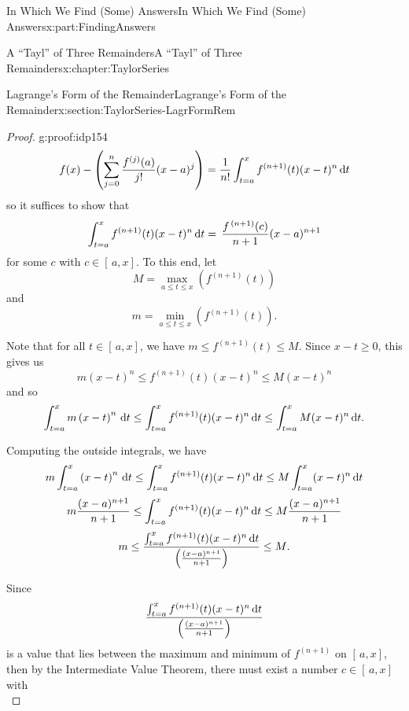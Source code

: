 \documentclass[oneside,10pt,]{book}
\numberwithin{equation}{section}
\newcommand{\dx}[1]{\,{\rm d}#1}
\begin{document}
\begin{partptx}{In Which We Find (Some) Answers}{}{In Which We Find (Some) Answers}{}{}{x:part:FindingAnswers}
\begin{chapterptx}{A ``Tayl'' of Three Remainders}{}{A ``Tayl'' of Three Remainders}{}{}{x:chapter:TaylorSeries}
\begin{sectionptx}{Lagrange's Form of the Remainder}{}{Lagrange's Form of the Remainder}{}{}{x:section:TaylorSeries-LagrFormRem}
\begin{proof}{}{g:proof:idp154}
\begin{equation*}
f(x)-\left(\sum_{j=0}^n\frac{f^{(j)}(a)}{j!}(x-a)^j\right)=\frac{1}{n!} \int_{t=a}^xf^{(n+1)}(t)(x-t)^n\dx{ t}
\end{equation*}
so it suffices to show that%
\begin{equation*}
\int_{t=a}^xf^{(n+1)}(t)(x-t)^n\dx{ t}=\,\frac{f^{\,(n+1)}(c)}{n+1}(x-a)^{n+1}
\end{equation*}
for some \(c\) with \(c\in[\,a,x]\). To this end, let%
\begin{equation*}
M=\max_{a\le t\le x}\left(f^{(n+1)}(t)\right)
\end{equation*}
and%
\begin{equation*}
m=\min_{a\le t\le x}\left(f^{(n+1)}(t)\right)\text{.}
\end{equation*}
%
\par
Note that for all \(t\in[\,a,x]\), we have \(m\leq f^{(n+1)}(t)\leq M\). Since \(x-t\geq 0\), this gives us%
\begin{equation}
m\left(x-t\right)^n\leq f^{(n+1)}(t)(x-t)^n\leq M(x-t)^n\label{x:men:eq_LagRem1}
\end{equation}
and so%
\begin{equation}
\int_{t=a}^xm\left(x-t\right)^n\dx{ t}\leq\int_{t=a}^xf^{(n+1)}(t)(x-t)^n\dx{ t}\leq \int_{t=a}^xM(x-t)^n\dx{ t}\text{.}\label{x:men:eq_LagRem2}
\end{equation}
%
\par
Computing the outside integrals, we have%
\begin{equation*}
m\int_{t=a}^x\left(x-t\right)^n\dx{ t}\leq\int_{t=a}^xf^{(n+1)}(t)(x-t)^n\dx{ t}\leq M\int_{t=a}^x(x-t)^n\dx{ t}
\end{equation*}
%
\begin{equation}
m\frac{(x-a)^{n+1}}{n+1}\leq\int_{t=a}^xf^{(n+1)}(t)(x-t)^n\dx{ t}\leq M\frac{(x-a)^{n+1}}{n+1}\label{x:men:eq_LagRem3}
\end{equation}
%
\begin{equation*}
m\leq\frac{\int_{t=a}^xf^{(n+1)}(t)(x-t)^n\dx{ t}}{\left(\frac{(x-a)^{n+1}}{n+1} \right)}\leq M\text{.}
\end{equation*}
%
\par
Since%
\begin{equation*}
\frac{\int_{t=a}^xf^{(n+1)}(t)(x-t)^n\dx{ t}}{\left(\frac{(x-a)^{n+1}}{n+1} \right)}
\end{equation*}
is a value that lies between the maximum and minimum of \(f^{(n+1)}\) on \([\,a,x]\), then by the Intermediate Value Theorem, there must exist a number \(c\in[\,a,x]\) with%
\begin{equation*}

\end{equation*}
\end{proof}
\end{sectionptx}
\end{chapterptx}
\end{partptx}
\end{document}
